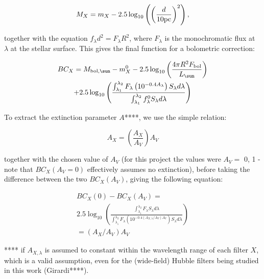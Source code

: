 \documentclass[usenatbib]{mnras}
\begin{document}
\begin{equation}
M_{X} = m_{X} - 2.5 \log_{10}\left( \left( \frac{d}{10 \textnormal{pc}} \right)^{2} \right),
\label{BC_def}
\end{equation}

together with the equation $f_{\lambda}d^{2}=F_{\lambda}R^{2}$, where $F_{\lambda}$ is the monochromatic flux at $\lambda$ at the stellar surface. This gives the final function for a bolometric correction:

\begin{multline}
BC_{X} = M_{\textnormal{bol},\sun} - m_{X}^{0} - 2.5 \log_{10} \left( \frac{4\pi R^{2}F_{\textnormal{bol}}}{L_{\sun}} \right) \\ + 2.5 \log_{10} \left( \frac{\int_{\lambda_{1}}^{\lambda_{2}} F_{\lambda} \left( 10^{-0.4 A_{\lambda}} \right) S_{\lambda} d\lambda}{\int_{\lambda_{1}}^{\lambda_{2}} f_{\lambda}^{0} S_{\lambda} d\lambda} \right)
\label{BC_extinc}
\end{multline}


To extract the extinction parameter $A$****, we use the simple relation:

\begin{equation}
A_{X} = \left( \frac{A_{X}}{A_{V}} \right) A_{V}
\label{ratio_eq}
\end{equation}

together with the chosen value of $A_{V}$ (for this project the values were $A_{V} =$ 0, 1 - note that $BC_{X}(A_{V}=0)$  effectively assumes no extinction), before taking the difference between the two $BC_{X}(A_{V})$, giving the following equation:

\begin{multline}
BC_{X}(0) - BC_{X}(A_{V}) = \\ 2.5 \log_{10} \left( \frac{\int_{\lambda_{1}}^{\lambda_{2}} F_{\lambda}  S_{\lambda} d\lambda}{\int_{\lambda_{1}}^{\lambda_{2}} F_{\lambda}\left( 10^{-0.4 \left(A_{X,\lambda}/A_{V}\right)A_{V}} \right) S_{\lambda} d\lambda} \right)
\\ = \left(A_{X}/A_{V}\right)A_{V}
\label{BCs_diff}
\end{multline}

**** if $A_{X,\lambda}$ is assumed to constant within the wavelength range of each filter $X$, which is a valid assumption, even for the (wide-field) Hubble filters being studied in this work (Girardi****).
\end{document}
